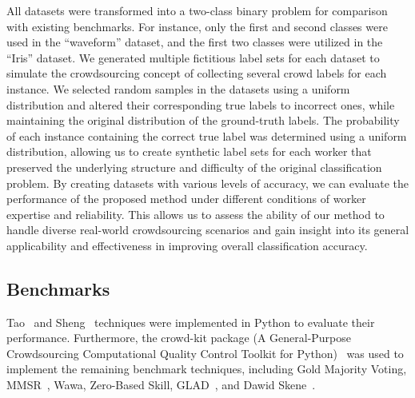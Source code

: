 All datasets were transformed into a two-class binary problem for comparison with existing benchmarks. For instance, only the first and second classes were used in the ``waveform'' dataset, and the first two classes were utilized in the ``Iris'' dataset.
We generated multiple fictitious label sets for each dataset to simulate the crowdsourcing concept of collecting several crowd labels for each instance. We selected random samples in the datasets using a uniform distribution and altered their corresponding true labels to incorrect ones, while maintaining the original distribution of the ground-truth labels. The probability of each instance containing the correct true label was determined using a uniform distribution, allowing us to create synthetic label sets for each worker that preserved the underlying structure and difficulty of the original classification problem. By creating datasets with various levels of accuracy, we can evaluate the performance of the proposed method under different conditions of worker expertise and reliability. This allows us to assess the ability of our method to handle diverse real-world crowdsourcing scenarios and gain insight into its general applicability and effectiveness in improving overall classification accuracy.

\subsection{Benchmarks}
Tao~\cite{tao_Label_2020} and Sheng~\cite{sheng_Majority_2019} techniques were implemented in Python to evaluate their performance. Furthermore, the crowd-kit package (A General-Purpose Crowdsourcing Computational Quality Control Toolkit for Python)~\cite{ustalov_learning_2021} was used to implement the remaining benchmark techniques, including Gold Majority Voting, MMSR~\cite{ma_Adversarial_2020}, Wawa, Zero-Based Skill, GLAD~\cite{whitehill_Whose_2009}, and Dawid Skene~\cite{dawid_Maximum_1979}.

